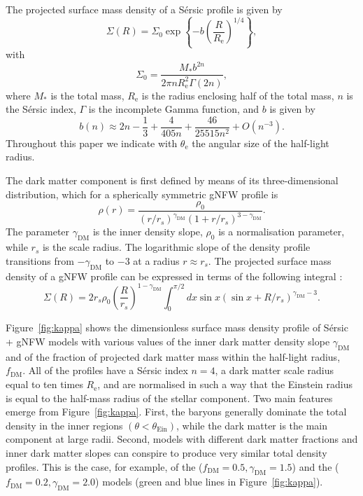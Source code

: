 \documentclass{aa}
\def\reff{R_{\mathrm{e}}}
\def\mstar{M_*}
\def\gammadm{\gamma_{\mathrm{DM}}}
\def\fdm{f_{\mathrm{DM}}}
\def\tein{\theta_{\mathrm{Ein}}}
\def\teff{\theta_{\mathrm{e}}}
\def\Fref#1{Figure~\ref{#1}\xspace}
\begin{document}
The projected surface mass density of a S\'{e}rsic profile is given by
\begin{equation}
\Sigma(R) = \Sigma_0 \exp{\left\{-b\left(\frac{R}{\reff}\right)^{1/4}\right\}},
\end{equation}
with
\begin{equation}
\Sigma_0 = \frac{\mstar b^{2n}}{2\pi n \reff^2 \Gamma(2n)},
\end{equation}
where $\mstar$ is the total mass, $\reff$ is the radius enclosing half of the total mass, $n$ is the S\'{e}rsic index, $\Gamma$ is the incomplete Gamma function, and $b$ is given by \citep{C+B99}
\begin{equation}
b(n) \approx 2n -\frac13 + \frac{4}{405n} + \frac{46}{25515n^2} + O(n^{-3}).
\end{equation}
Throughout this paper we indicate with $\teff$ the angular size of the half-light radius.

The dark matter component is first defined by means of its three-dimensional distribution, which for a spherically symmetric gNFW profile is
\begin{equation}
\rho(r) = \dfrac{\rho_0}{(r/r_s)^{\gammadm}\left(1 + r/r_s\right)^{3-\gammadm}}.
\end{equation}
The parameter $\gammadm$ is the inner density slope, $\rho_0$ is a normalisation parameter, while $r_s$ is the scale radius. The logarithmic slope of the density profile transitions from $-\gammadm$ to $-3$ at a radius $r\approx r_s$.
The projected surface mass density of a gNFW profile can be expressed in terms of the following integral \citep{WTS01}:
\begin{equation}
\Sigma(R) = 2r_s\rho_0 \left(\frac{R}{r_s}\right)^{1-\gammadm}\int_0^{\pi/2} dx \sin{x}(\sin{x} + R/r_s)^{\gammadm-3}.
\end{equation}

\Fref{fig:kappa} shows the dimensionless surface mass density profile of S\'{e}rsic + gNFW models with various values of the inner dark matter density slope $\gammadm$ and of the fraction of projected dark matter mass within the half-light radius, $\fdm$.
All of the profiles have a S\'{e}rsic index $n=4$, a dark matter scale radius equal to ten times $\reff$, and are normalised in such a way that the Einstein radius is equal to the half-mass radius of the stellar component. 
Two main features emerge from \Fref{fig:kappa}. First, the baryons generally dominate the total density in the inner regions $(\theta < \tein)$, while the dark matter is the main component at large radii.
Second, models with different dark matter fractions and inner dark matter slopes can conspire to produce very similar total density profiles. 
This is the case, for example, of the ($\fdm=0.5,\gammadm=1.5$) and the ($\fdm=0.2,\gammadm=2.0$) models (green and blue lines in \Fref{fig:kappa}).
\end{document}
